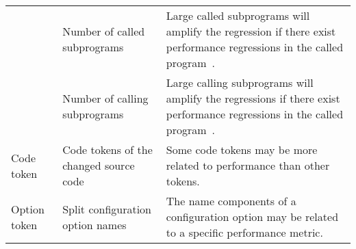 \begin{table}[t]
\begin{tabular}{|p{1.2cm}|p{1.8cm}|p{4.5cm}|}
  \cline{2-3} 
  & Number of called subprograms & Large called subprograms will amplify the regression if there exist performance regressions in the called program~\cite{Nagappan:2006:MMP}.\\
  \cline{2-3} 
  & Number of calling subprograms & Large   calling subprograms will amplify the regressions if there exist performance regressions in the called program~\cite{Nagappan:2006:MMP}.\\ 
  \hline
Code token& Code tokens of the changed source code & Some code tokens may be more related to performance than other tokens.\\ 
\hline
Option token & Split configuration option names & The name components of a configuration option may be related to a specific performance metric.\\ \hline
\end{tabular}
\label{tab:metrics}
\end{table}
